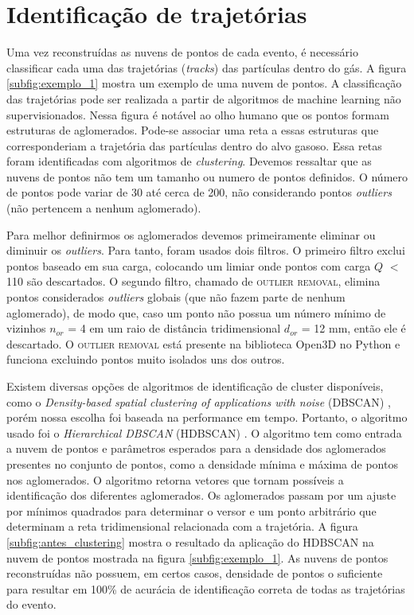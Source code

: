 \documentclass[a4paper,12pt,oneside]{book}
\begin{document}
\section{Identificação de trajetórias}\label{sec:forcabruta}

\par Uma vez reconstruídas as nuvens de pontos de cada evento, é necessário classificar cada uma das trajetórias (\textit{tracks}) das partículas dentro do gás. A figura \ref{subfig:exemplo_1} mostra um exemplo de uma nuvem de pontos. A classificação das trajetórias pode ser realizada a partir de algoritmos de machine learning não supervisionados. Nessa figura é notável ao olho humano que os pontos formam estruturas de aglomerados. Pode-se associar uma reta a essas estruturas que corresponderiam a trajetória das partículas dentro do alvo gasoso. Essa retas foram identificadas com algoritmos de \textit{clustering}. Devemos ressaltar que as nuvens de pontos não tem um tamanho ou numero de pontos definidos. O número de pontos pode variar de 30 até cerca de 200, não considerando pontos \textit{outliers} (não pertencem a nenhum aglomerado).

\par Para melhor definirmos os aglomerados devemos primeiramente eliminar ou diminuir os \textit{outliers}. Para tanto, foram usados dois filtros. O primeiro filtro exclui pontos baseado em sua carga, colocando um limiar onde pontos com carga $Q$ $<$ 110 são descartados. O segundo filtro, chamado de \textsc{outlier removal}, elimina pontos considerados \textit{outliers} globais (que não fazem parte de nenhum aglomerado), de modo que, caso um ponto não possua um número mínimo de vizinhos $n_{or}$ = 4 em um raio de distância tridimensional $d_{or}$ = 12 mm, então ele é descartado. O \textsc{outlier removal} está presente na biblioteca Open3D \cite{open3d} no Python e funciona excluindo pontos muito isolados uns dos outros.

\par Existem diversas opções de algoritmos de identificação de cluster disponíveis, como o \textit{Density-based spatial clustering of applications with noise} (\textsc{DBSCAN}) \cite{dbscan}, porém nossa escolha foi baseada na performance em tempo. Portanto, o algoritmo usado foi o \textit{Hierarchical DBSCAN} (\textsc{HDBSCAN}) \cite{hdbscan1, hdbscan2}. O algoritmo tem como entrada a nuvem de pontos e parâmetros esperados para a densidade dos aglomerados presentes no conjunto de pontos, como a densidade mínima e máxima de pontos nos aglomerados. O algoritmo retorna vetores que tornam possíveis a identificação dos diferentes aglomerados. Os aglomerados passam por um ajuste por mínimos quadrados para determinar o versor e um ponto arbitrário que determinam a reta tridimensional relacionada com a trajetória. A figura \ref{subfig:antes_clustering} mostra o resultado da aplicação do \textsc{HDBSCAN} na nuvem de pontos mostrada na figura \ref{subfig:exemplo_1}. As nuvens de pontos reconstruídas não possuem, em certos casos, densidade de pontos o suficiente para resultar em 100\% de acurácia de identificação correta de todas as trajetórias do evento.
\end{document}
